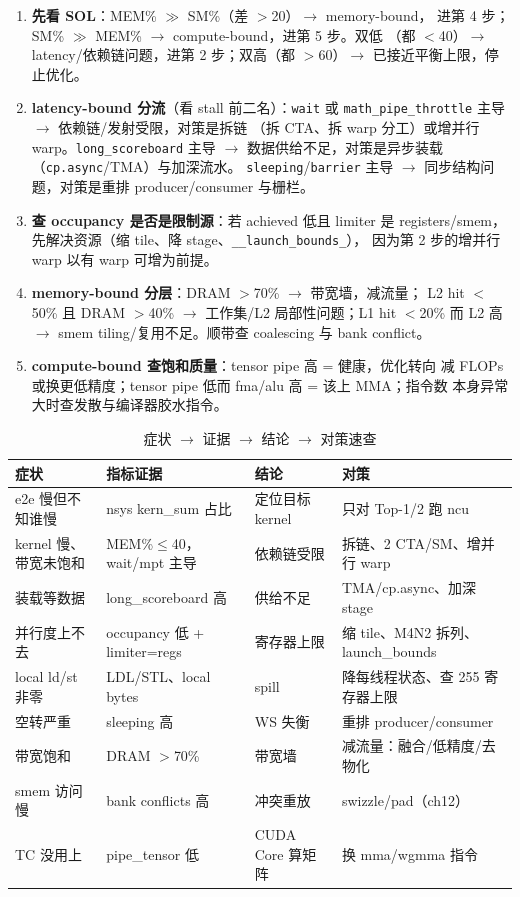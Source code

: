 \begin{enumerate}
\item \textbf{先看 SOL}：MEM\% $\gg$ SM\%（差 $>$20）$\to$ memory-bound，
  进第 4 步；SM\% $\gg$ MEM\% $\to$ compute-bound，进第 5 步。双低
  （都 $<$40）$\to$ latency/依赖链问题，进第 2 步；双高（都 $>$60）$\to$
  已接近平衡上限，停止优化。
\item \textbf{latency-bound 分流}（看 stall 前二名）：\texttt{wait} 或
  \texttt{math\_\allowbreak{}pipe\_\allowbreak{}throttle} 主导 $\to$ 依赖链/发射受限，对策是拆链
  （拆 CTA、拆 warp 分工）或增并行 warp。\texttt{long\_\allowbreak{}scoreboard} 主导
  $\to$ 数据供给不足，对策是异步装载（\texttt{cp.async}/TMA）与加深流水。
  \texttt{sleeping}/\texttt{barrier} 主导 $\to$ 同步结构问题，对策是重排
  producer/consumer 与栅栏。
\item \textbf{查 occupancy 是否是限制源}：若 achieved 低且 limiter 是
  registers/smem，先解决资源（缩 tile、降 stage、\texttt{\_\allowbreak{}\_\allowbreak{}launch\_\allowbreak{}bounds\_\allowbreak{}}），
  因为第 2 步的增并行 warp 以有 warp 可增为前提。
\item \textbf{memory-bound 分层}：DRAM $>$70\% $\to$ 带宽墙，减流量；
  L2 hit $<$50\% 且 DRAM $>$40\% $\to$ 工作集/L2 局部性问题；L1 hit $<$20\%
  而 L2 高 $\to$ smem tiling/复用不足。顺带查 coalescing 与 bank conflict。
\item \textbf{compute-bound 查饱和质量}：tensor pipe 高 = 健康，优化转向
  减 FLOPs 或换更低精度；tensor pipe 低而 fma/alu 高 = 该上 MMA；指令数
  本身异常大时查发散与编译器胶水指令。
\end{enumerate}

\begin{table}[htbp]
\centering
\caption{症状 $\to$ 证据 $\to$ 结论 $\to$ 对策速查}
\label{tab:00-tree}
\begin{tabular}{p{3.4cm}p{4.2cm}p{2.6cm}p{4.4cm}}
\toprule
症状 & 指标证据 & 结论 & 对策 \\
\midrule
e2e 慢但不知谁慢 & nsys kern\_sum 占比 & 定位目标 kernel & 只对 Top-1/2 跑 ncu \\
kernel 慢、带宽未饱和 & MEM\%$\le$40，wait/mpt 主导 & 依赖链受限 & 拆链、2 CTA/SM、增并行 warp \\
装载等数据 & long\_scoreboard 高 & 供给不足 & TMA/cp.async、加深 stage \\
并行度上不去 & occupancy 低 + limiter=regs & 寄存器上限 & 缩 tile、M4N2 拆列、launch\_bounds \\
local ld/st 非零 & LDL/STL、local bytes & spill & 降每线程状态、查 255 寄存器上限 \\
空转严重 & sleeping 高 & WS 失衡 & 重排 producer/consumer \\
带宽饱和 & DRAM $>$70\% & 带宽墙 & 减流量：融合/低精度/去物化 \\
smem 访问慢 & bank conflicts 高 & 冲突重放 & swizzle/pad（ch12） \\
TC 没用上 & pipe\_tensor 低 & CUDA Core 算矩阵 & 换 mma/wgmma 指令 \\
\bottomrule
\end{tabular}
\end{table}

